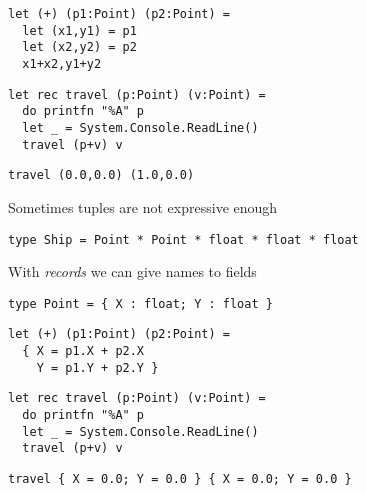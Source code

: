 \documentclass{beamer}
\begin{document}
\begin{frame}[fragile]
\begin{lstlisting}
let (+) (p1:Point) (p2:Point) = 
  let (x1,y1) = p1
  let (x2,y2) = p2
  x1+x2,y1+y2  
\end{lstlisting}
\end{frame}

\begin{frame}[fragile]
\begin{lstlisting}
let rec travel (p:Point) (v:Point) =
  do printfn "%A" p
  let _ = System.Console.ReadLine()
  travel (p+v) v
\end{lstlisting}
\end{frame}

\begin{frame}[fragile]
\begin{lstlisting}
travel (0.0,0.0) (1.0,0.0)
\end{lstlisting}
\end{frame}

\begin{slide}{
\item Sometimes tuples are not expressive enough
\item \texttt{type Ship = Point * Point * float * float * float}
\pause
\item With \textit{records} we can give names to fields
}\end{slide}

\begin{frame}[fragile]
\begin{lstlisting}
type Point = { X : float; Y : float }
\end{lstlisting}
\end{frame}

\begin{frame}[fragile]
\begin{lstlisting}
let (+) (p1:Point) (p2:Point) = 
  { X = p1.X + p2.X
    Y = p1.Y + p2.Y }
\end{lstlisting}
\end{frame}

\begin{frame}[fragile]
\begin{lstlisting}
let rec travel (p:Point) (v:Point) =
  do printfn "%A" p
  let _ = System.Console.ReadLine()
  travel (p+v) v
\end{lstlisting}
\end{frame}

\begin{frame}[fragile]
\begin{lstlisting}
travel { X = 0.0; Y = 0.0 } { X = 0.0; Y = 0.0 }
\end{lstlisting}
\end{frame}
\end{document}
